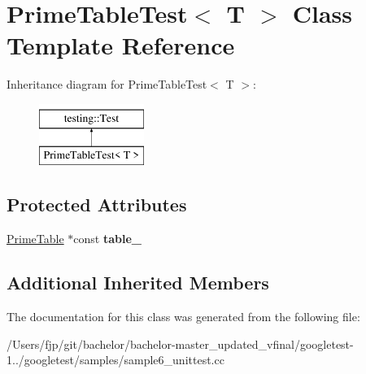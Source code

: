 \hypertarget{class_prime_table_test}{}\section{Prime\+Table\+Test$<$ T $>$ Class Template Reference}
\label{class_prime_table_test}
Inheritance diagram for Prime\+Table\+Test$<$ T $>$\+:\begin{figure}[H]
\begin{center}
\leavevmode
\includegraphics[height=2.000000cm]{class_prime_table_test}
\end{center}
\end{figure}
\subsection*{Protected Attributes}
\begin{DoxyCompactItemize}
\item 
\mbox{\label{class_prime_table_test_a86da90fc6d5cef6386d0cd8fb52b4046}} 
\mbox{\hyperlink{class_prime_table}{Prime\+Table}} $\ast$const {\bfseries table\+\_\+}
\end{DoxyCompactItemize}
\subsection*{Additional Inherited Members}


The documentation for this class was generated from the following file\+:\begin{DoxyCompactItemize}
\item 
/\+Users/fjp/git/bachelor/bachelor-\/master\+\_\+updated\+\_\+vfinal/googletest-\/1../googletest/samples/sample6\+\_\+unittest.\+cc\end{DoxyCompactItemize}

